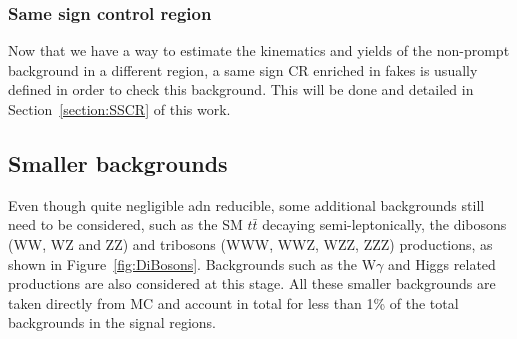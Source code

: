 \documentclass[a4paper, 10pt, openright]{report}
\begin{document}
\subsubsection*{Same sign control region}

Now that we have a way to estimate the kinematics and yields of the non-prompt background in a different region, a same sign \ac{CR} enriched in fakes is usually defined in order to check this background. This will be done and detailed in Section~\ref{section:SSCR} of this work.

%
%

\subsection{Smaller backgrounds} \label{subsection:SmallerBkg}

Even though quite negligible adn reducible, some additional backgrounds still need to be considered, such as the \ac{SM} $t \bar t$ decaying semi-leptonically, the dibosons (WW, WZ and ZZ) and tribosons (WWW, WWZ, WZZ, ZZZ) productions, as shown in Figure~\ref{fig:DiBosons}. Backgrounds such as the W$\gamma$ and Higgs related productions are also considered at this stage. All these smaller backgrounds are taken directly from \ac{MC} and account in total for less than 1\% of the total backgrounds in the signal regions. 
\end{document}
